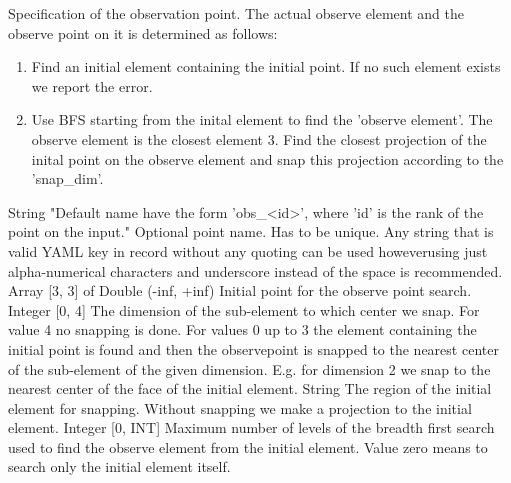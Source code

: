 \begin{RecordType}
	{}
	{} %
	{} %
	{} %
	{{{{Specification of the observation point. The actual observe element and the observe point on it is determined as follows:}
}
\begin{enumerate}
\item {Find an initial element containing the initial point. If no such element exists we report the error.}
\item {Use BFS starting from the inital element to find the 'observe element'. The observe element is the closest element 3. Find the closest projection of the inital point on the observe element and snap this projection according to the 'snap{\_}dim'.}
\end{enumerate}
}}
		\KeyItem
			{}
			{{String}}
			{"{Default name have the form 'obs{\_}{\textless}id{\textgreater}', where 'id' is the rank of the point on the input.}"}
			{} %
			{{{Optional point name. Has to be unique. Any string that is valid YAML key in record without any quoting can be used howeverusing just alpha-numerical characters and underscore instead of the space is recommended. }}}
		\KeyItem
			{}
			{{Array [3, 3] of }{Double (-inf, +inf)}}
			{\textrangle}
			{} %
			{{{Initial point for the observe point search.}}}
		\KeyItem
			{}
			{{Integer [0, 4]}}
			{\textrangle}
			{} %
			{{{The dimension of the sub-element to which center we snap. For value 4 no snapping is done. For values 0 up to 3 the element containing the initial point is found and then the observepoint is snapped to the nearest center of the sub-element of the given dimension. E.g. for dimension 2 we snap to the nearest center of the face of the initial element.}}}
		\KeyItem
			{}
			{{String}}
			{\textrangle}
			{} %
			{{{The region of the initial element for snapping. Without snapping we make a projection to the initial element.}}}
		\KeyItem
			{}
			{{Integer [0, INT]}}
			{\textrangle}
			{} %
			{{{Maximum number of levels of the breadth first search used to find the observe element from the initial element. Value zero means to search only the initial element itself.}}}
\end{RecordType}
